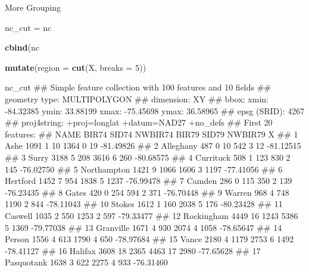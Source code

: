\documentclass[11pt,ignorenonframetext,]{beamer}
\newenvironment{Shaded}{}{}
\newcommand{\KeywordTok}[1]{\textcolor[rgb]{0.00,0.44,0.13}{\textbf{#1}}}
\newcommand{\DataTypeTok}[1]{\textcolor[rgb]{0.56,0.13,0.00}{#1}}
\newcommand{\DecValTok}[1]{\textcolor[rgb]{0.25,0.63,0.44}{#1}}
\newcommand{\StringTok}[1]{\textcolor[rgb]{0.25,0.44,0.63}{#1}}
\newcommand{\OperatorTok}[1]{\textcolor[rgb]{0.40,0.40,0.40}{#1}}
\newcommand{\NormalTok}[1]{#1}
\let\oldShaded\Shaded
\let\endoldShaded\endShaded
\renewenvironment{Shaded}{\footnotesize\begin{spacing}{0.9}\oldShaded}{\endoldShaded\end{spacing}}
\let\oldverbatim\verbatim
\let\endoldverbatim\endverbatim
\newcommand{\scriptoutput}{
  \renewenvironment{Shaded}{\scriptsize\begin{spacing}{0.9}\oldShaded}{\endoldShaded\end{spacing}}
  \renewenvironment{verbatim}{\scriptsize\begin{spacing}{0.9}\oldverbatim}{\endoldverbatim\end{spacing}}
}
\begin{document}
\begin{frame}[fragile,t]{More Grouping}

\scriptoutput

\begin{Shaded}
\begin{Highlighting}[]
\NormalTok{nc_cut =}\StringTok{ }\NormalTok{nc }\OperatorTok{%
\StringTok{  }\KeywordTok{cbind}\NormalTok{(nc }\OperatorTok{%
\StringTok{  }\KeywordTok{mutate}\NormalTok{(}\DataTypeTok{region =} \KeywordTok{cut}\NormalTok{(X, }\DataTypeTok{breaks =} \DecValTok{5}\NormalTok{))}

\NormalTok{nc_cut}
\NormalTok{## Simple feature collection with 100 features and 10 fields}
\NormalTok{## geometry type:  MULTIPOLYGON}
\NormalTok{## dimension:      XY}
\NormalTok{## bbox:           xmin: -84.32385 ymin: 33.88199 xmax: -75.45698 ymax: 36.58965}
\NormalTok{## epsg (SRID):    4267}
\NormalTok{## proj4string:    +proj=longlat +datum=NAD27 +no_defs}
\NormalTok{## First 20 features:}
\NormalTok{##           NAME BIR74 SID74 NWBIR74 BIR79 SID79 NWBIR79         X}
\NormalTok{## 1         Ashe  1091     1      10  1364     0      19 -81.49826}
\NormalTok{## 2    Alleghany   487     0      10   542     3      12 -81.12515}
\NormalTok{## 3        Surry  3188     5     208  3616     6     260 -80.68575}
\NormalTok{## 4    Currituck   508     1     123   830     2     145 -76.02750}
\NormalTok{## 5  Northampton  1421     9    1066  1606     3    1197 -77.41056}
\NormalTok{## 6     Hertford  1452     7     954  1838     5    1237 -76.99478}
\NormalTok{## 7       Camden   286     0     115   350     2     139 -76.23435}
\NormalTok{## 8        Gates   420     0     254   594     2     371 -76.70448}
\NormalTok{## 9       Warren   968     4     748  1190     2     844 -78.11043}
\NormalTok{## 10      Stokes  1612     1     160  2038     5     176 -80.23428}
\NormalTok{## 11     Caswell  1035     2     550  1253     2     597 -79.33477}
\NormalTok{## 12  Rockingham  4449    16    1243  5386     5    1369 -79.77038}
\NormalTok{## 13   Granville  1671     4     930  2074     4    1058 -78.65647}
\NormalTok{## 14      Person  1556     4     613  1790     4     650 -78.97684}
\NormalTok{## 15       Vance  2180     4    1179  2753     6    1492 -78.41127}
\NormalTok{## 16     Halifax  3608    18    2365  4463    17    2980 -77.65628}
\NormalTok{## 17  Pasquotank  1638     3     622  2275     4     933 -76.31460}
}}
\end{Highlighting}
\end{Shaded}
\end{frame}
\end{document}
